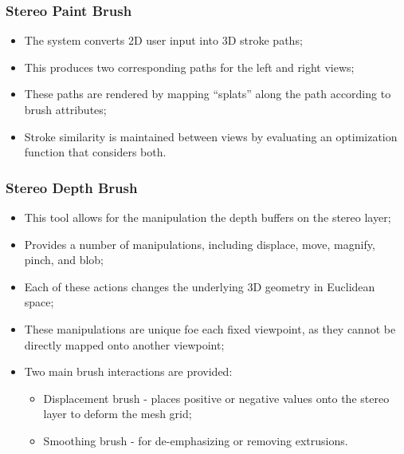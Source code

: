 \documentclass{beamer}
\begin{document}
\begin{frame}
    \frametitle{Stereo Paint Brush}
    \begin{itemize}
        \item The system converts 2D user input into 3D stroke paths;
        \item This produces two corresponding paths for the left and right
        views;
        \item These paths are rendered by mapping ``splats'' along the path
        according to brush attributes;
        \item Stroke similarity is maintained between views by evaluating an
        optimization function that considers both.
    \end{itemize}
\end{frame}

\begin{frame}
    \frametitle{Stereo Depth Brush}
    \begin{itemize}
        \item This tool allows for the manipulation the depth buffers on the
        stereo layer;
        \item Provides a number of manipulations, including displace, move,
        magnify, pinch, and blob;
        \item Each of these actions changes the underlying 3D geometry in
        Euclidean space;
        \item These manipulations are unique foe each fixed viewpoint, as they
        cannot be directly mapped onto another viewpoint;
        \item Two main brush interactions are provided:
        \begin{itemize}
            \item Displacement brush - places positive or negative values onto
            the stereo layer to deform the mesh grid;
            \item Smoothing brush - for de-emphasizing or removing extrusions.
        \end{itemize}
    \end{itemize}
\end{frame}
\end{document}
